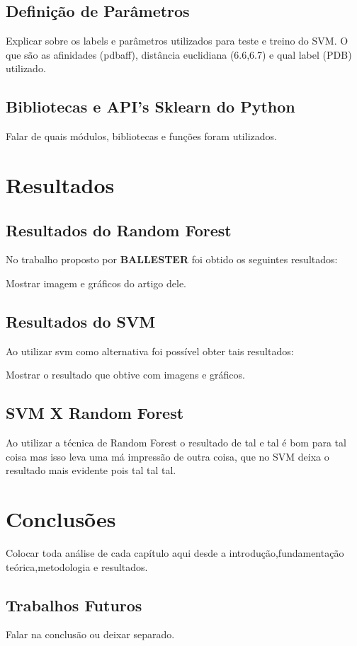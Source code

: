 \documentclass[tcc, capa]{texucpel}
\begin{document}
\section{Definição de Parâmetros}

Explicar sobre os labels e parâmetros utilizados para teste e treino do SVM.
O que são as afinidades (pdbaff), distância euclidiana (6.6,6.7) e qual label (PDB) utilizado.

\section{Bibliotecas e API's Sklearn do Python}

Falar de quais módulos, bibliotecas e funções  foram utilizados.

\chapter{Resultados}

\section{Resultados do Random Forest}

No trabalho proposto por \textbf{BALLESTER} foi obtido os seguintes resultados:

Mostrar imagem e gráficos do artigo dele.

\section{Resultados do SVM}

Ao utilizar svm como alternativa foi possível obter tais resultados:

Mostrar o resultado que obtive com imagens e gráficos.

\section{SVM X Random Forest}

Ao utilizar a técnica de Random Forest o resultado de tal e tal é bom para tal coisa mas isso leva uma má impressão de outra coisa, que no SVM deixa o resultado mais evidente pois tal tal tal.

\chapter{Conclusões}

Colocar toda análise de cada capítulo aqui desde a introdução,fundamentação teórica,metodologia e resultados.

\section{Trabalhos Futuros}

Falar na conclusão ou deixar separado.




\end{document}
